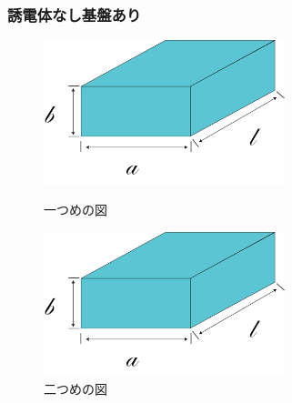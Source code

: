 \subsubsection{誘電体なし基盤あり}
\begin{figure}[h]
 \begin{minipage}{0.5\hsize}
  \begin{center}
   \includegraphics[width=70mm]{./image/空洞共振器.png}
  \end{center}
  \caption{一つめの図}
  \label{fig:one}
 \end{minipage}
 \begin{minipage}{0.5\hsize}
  \begin{center}
   \includegraphics[width=70mm]{./image/空洞共振器.png}
  \end{center}
  \caption{二つめの図}
  \label{fig:two}
 \end{minipage}
\end{figure}

